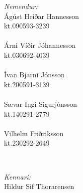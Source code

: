 \begin{titlepage}
\begin{minipage}{0.4\textwidth}
\begin{flushleft} \large
\emph{Nemendur:}\\
Ágúst Heiðar Hannesson\\ kt.090593-3239 \\ \hspace{0.3cm} \\
Árni Víðir Jóhannesson\\ kt.030692-4039 \\ \hspace{0.3cm} \\
Ívan Bjarni Jónsson\\ kt.200591-3139 \\ \hspace{0.3cm} \\
Sævar Ingi Sigurjónsson\\ kt.140291-2779 \\ \hspace{0.3cm} \\
Vilhelm Friðriksson\\ kt.230292-2649
\end{flushleft}
\end{minipage}
~
\begin{minipage}{0.4\textwidth} %
\begin{flushright} \large
\emph{Kennari:} \\
Hildur Sif Thorarensen\\ \hspace{0.3cm} \\%
\hspace{0.3cm} \\
\hspace{0.3cm} \\
\hspace{0.3cm} \\
\hspace{0.3cm} \\
\hspace{0.3cm} \\
\hspace{0.3cm} \\
\hspace{0.3cm} \\
\hspace{0.3cm} \\
\hspace{0.3cm} \\
\hspace{0.3cm} \\
\hspace{0.3cm} \\
\hspace{0.3cm} \\
\end{flushright}
\end{minipage}\\[2cm]


\end{titlepage}

